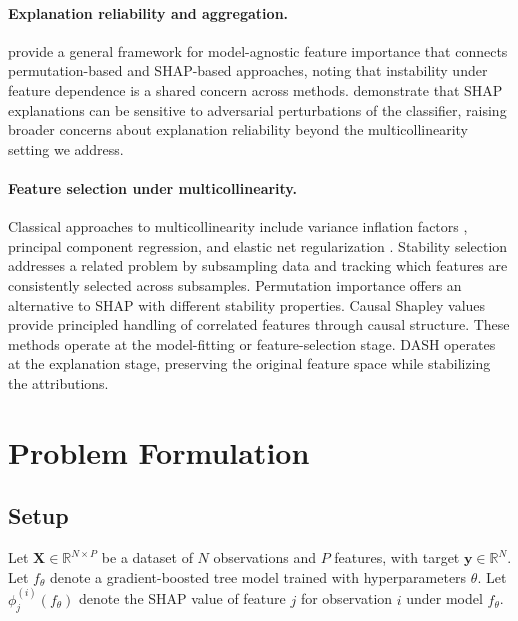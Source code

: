 \documentclass[10pt]{article}
\newcommand{\dash}{\textsc{DASH}}
\begin{document}
\paragraph{Explanation reliability and aggregation.}
\citet{molnar2022general} provide a general framework for model-agnostic
feature importance that connects permutation-based and SHAP-based
approaches, noting that instability under feature dependence is a shared
concern across methods. \citet{slack2020fooling} demonstrate that
SHAP explanations can be sensitive to adversarial perturbations of the
classifier, raising broader concerns about explanation reliability
beyond the multicollinearity setting we address.

\paragraph{Feature selection under multicollinearity.}
Classical approaches to multicollinearity include variance inflation
factors \citep{obrien2007caution}, principal component regression, and
elastic net regularization \citep{zou2005regularization}. Stability
selection \citep{meinshausen2010stability} addresses a related problem
by subsampling data and tracking which features are consistently
selected across subsamples. Permutation importance
\citep{altmann2010permutation} offers an alternative to SHAP with
different stability properties. Causal Shapley values
\citep{heskes2020causal} provide principled handling of correlated
features through causal structure. These methods operate at the
model-fitting or feature-selection stage. \dash{} operates at the
explanation stage, preserving the original feature space while
stabilizing the attributions.


\section{Problem Formulation}
\label{sec:problem}

\subsection{Setup}

Let $\mathbf{X} \in \mathbb{R}^{N \times P}$ be a dataset of $N$
observations and $P$ features, with target $\mathbf{y} \in \mathbb{R}^N$.
Let $f_\theta$ denote a gradient-boosted tree model trained with
hyperparameters $\theta$. Let $\phi_j^{(i)}(f_\theta)$ denote the SHAP
value of feature $j$ for observation $i$ under model $f_\theta$.
\end{document}
